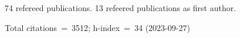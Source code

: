 74 refereed publications. 13 refeered publications as first author.

Total citations~=~3512; h-index~=~34 (2023-09-27)